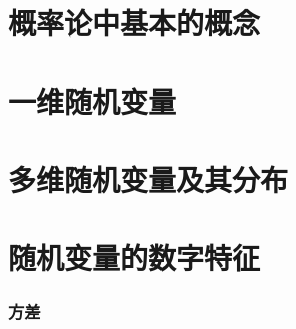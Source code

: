 
\usepackage{ctex}
\usepackage{pifont}
\usepackage{cleveref}
\usepackage{pstricks}
\usepackage{pgfplots}





\part{概率论中基本的概念}


\begin{shaded}
    
\end{shaded}


\begin{shaded}
    
\end{shaded}

\part{一维随机变量}





\part{多维随机变量及其分布}





\part{随机变量的数字特征}




\section{方差}






